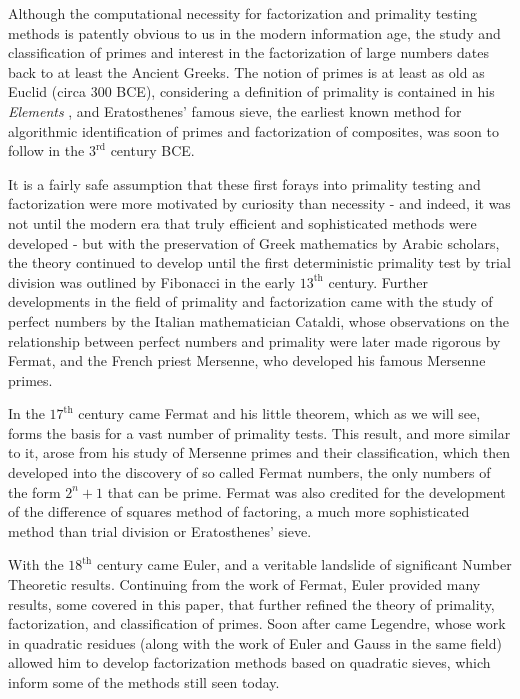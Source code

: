 \documentclass{article}
\begin{document}
\par Although the computational necessity for factorization and primality testing methods is patently obvious to us in the modern 
information age, the study and classification of primes and interest in the factorization of large numbers dates back to at least the Ancient Greeks. The notion of primes is at least as old as Euclid (circa 300 BCE), considering a definition of primality is contained in his \textit{ Elements} 
, and Eratosthenes' famous sieve, the earliest known method for algorithmic identification of primes and factorization of composites, was soon to follow in the $3^{\text{rd}}$ century BCE. 
\par It is a fairly safe assumption that these first forays into primality testing and factorization were more motivated by curiosity than necessity -  and indeed, it was not until the modern era that truly efficient and sophisticated methods were developed - but with the preservation of Greek mathematics by Arabic scholars, the theory continued to develop until the first deterministic primality test by trial division was outlined by Fibonacci in the early $13^{\text{th}}$ century. Further developments in the field of primality and factorization came with the study of perfect numbers by the Italian mathematician Cataldi, whose observations on the relationship between perfect numbers and primality were later made rigorous by Fermat, and the French priest Mersenne, who developed his famous Mersenne primes.
\par In the $17^{\text{th}}$ century came Fermat and his little theorem, which as we will see, forms the basis for a vast number of primality tests. This result, and more similar to it, arose from his study of Mersenne primes and their classification, which then developed into the discovery of so called Fermat numbers, the only numbers of the form $2^n + 1$ that can be prime. Fermat was also credited for the development of the difference of squares method of factoring, a much more sophisticated method than trial division or Eratosthenes' sieve.
\par With the $18^{\text{th}}$ century came Euler, and a veritable landslide of significant Number Theoretic results. Continuing from the work of Fermat, Euler provided many results, some covered in this paper, that further refined the theory of primality, factorization, and classification of primes. Soon after came Legendre, whose work in quadratic residues (along with the work of Euler and Gauss in the same field) allowed him to develop factorization methods based on quadratic sieves, which inform some of the methods still seen today.
\end{document}
